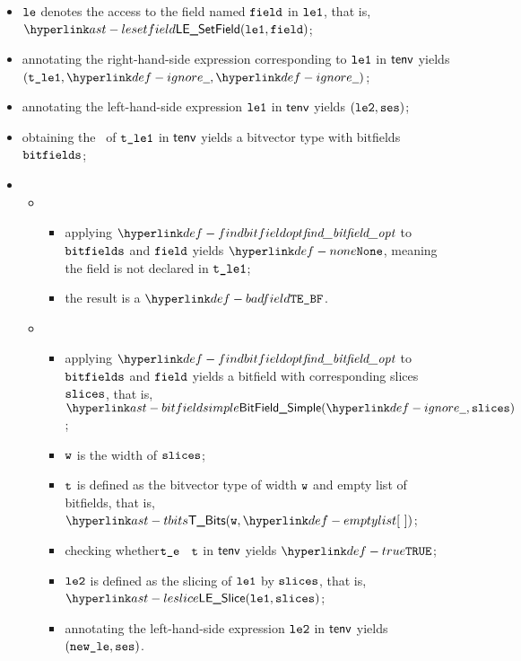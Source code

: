 \ProseParagraph
\AllApply
\begin{itemize}
  \item $\texttt{le}$ denotes the access to the field named $\texttt{field}$ in $\texttt{le1}$, that is, \\ $\LESetField(\vleone, \field)$;
  \item annotating the right-hand-side expression corresponding to $\texttt{le1}$ in $\textsf{tenv}$ yields \\ $(\vtleone, \Ignore, \Ignore)$\ProseOrTypeError;
  \item annotating the left-hand-side expression $\texttt{le1}$ in $\textsf{tenv}$ yields $(\texttt{le2}, \texttt{ses})$\ProseOrTypeError;
  \item obtaining the \underlyingtype\ of $\texttt{t\_le1}$ in $\textsf{tenv}$ yields a bitvector type with bitfields $\texttt{bitfields}$\ProseOrTypeError;
  \item \OneApplies
  \begin{itemize}
    \item {}
    \begin{itemize}
      \item applying $\findbitfieldopt$ to $\texttt{bitfields}$ and $\texttt{field}$ yields $\None$, meaning the field is not declared
            in $\texttt{t\_le1}$;
      \item the result is a \typingerrorterm{} $\BadField$.
    \end{itemize}

    \item {}
    \begin{itemize}
      \item applying $\findbitfieldopt$ to $\texttt{bitfields}$ and $\texttt{field}$ yields a bitfield with corresponding slices $\texttt{slices}$,
            that is, $\BitFieldSimple(\Ignore, \slices)$;
      \item $\texttt{w}$ is the width of $\texttt{slices}$;
      \item $\texttt{t}$ is defined as the bitvector type of width $\texttt{w}$ and empty list of bitfields, that is, $\TBits(\vw, \emptylist)$;
      \item checking whether$\texttt{t\_e}$ \typesatisfies\ $\texttt{t}$ in $\textsf{tenv}$ yields $\True$\ProseOrTypeError;
      \item $\texttt{le2}$ is defined as the slicing of $\texttt{le1}$ by $\texttt{slices}$, that is, \\ $\LESlice(\vleone, \slices)$;
      \item annotating the left-hand-side expression $\texttt{le2}$ in $\textsf{tenv}$ yields \\ $(\texttt{new\_le}, \texttt{ses})$\ProseOrTypeError.
    \end{itemize}


\end{itemize}
\end{itemize}
